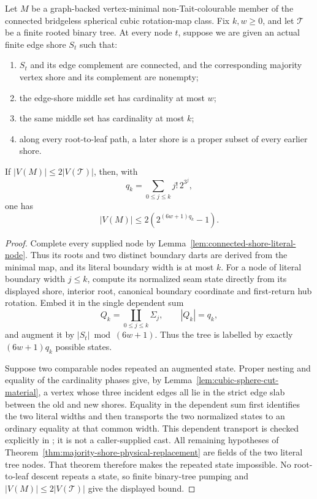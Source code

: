 \begin{theorem}
\label{thm:literal-majority-shore-tree-descent}
Let \(M\) be a graph-backed vertex-minimal non-Tait-colourable member of the
connected bridgeless spherical cubic rotation-map class.  Fix \(k,w\ge0\),
and let \(\mathcal T\) be a finite rooted binary tree.  At every node \(t\),
suppose we are given an actual finite edge shore \(S_t\) such that:
\begin{enumerate}
\item \(S_t\) and its edge complement are connected, and the corresponding
majority vertex shore and its complement are nonempty;
\item the edge-shore middle set has cardinality at most \(w\);
\item the same middle set has cardinality at most \(k\);
\item along every root-to-leaf path, a later shore is a proper subset of every
earlier shore.
\end{enumerate}
If \(|V(M)|\le2|V(\mathcal T)|\), then, with
\[
             q_k=\sum_{0\le j\le k} j!\,2^{3^j},
\]
one has
\[
             |V(M)|\le
             2\left(2^{(6w+1)q_k}-1\right).
\]
\end{theorem}

\begin{proof}
Complete every supplied node by
Lemma~\ref{lem:connected-shore-literal-node}.  Thus its roots and two distinct
boundary darts are derived from the minimal map, and its literal boundary
width is at most \(k\).
For a node of literal boundary width \(j\le k\), compute its normalized seam
state directly from its displayed shore, interior root, canonical boundary
coordinate and first-return hub rotation.  Embed it in the single dependent
sum
\[
       Q_k=\coprod_{0\le j\le k}\Sigma_j,
       \qquad |Q_k|=q_k,
\]
and augment it by \(|S_t|\bmod(6w+1)\).  Thus the tree is labelled by exactly
\((6w+1)q_k\) possible states.

Suppose two comparable nodes repeated an augmented state.  Proper nesting and
equality of the cardinality phases give, by
Lemma~\ref{lem:cubic-sphere-cut-material}, a vertex whose three incident edges
all lie in the strict edge slab between the old and new shores.  Equality in
the dependent sum first identifies the two literal widths and then transports
the two normalized states to an ordinary equality at that common width.  This
dependent transport is checked explicitly in
;
it is not a caller-supplied cast.  All remaining hypotheses of
Theorem~\ref{thm:majority-shore-physical-replacement} are fields of the two
literal tree nodes.  That theorem therefore makes the repeated state
impossible.  No root-to-leaf descent repeats a state, so finite binary-tree
pumping and \(|V(M)|\le2|V(\mathcal T)|\) give the displayed bound.
\end{proof}

